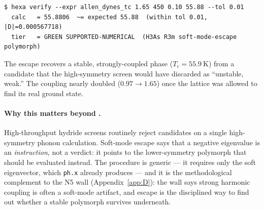 \begin{lstlisting}[basicstyle=\ttfamily\footnotesize,frame=single,xleftmargin=0pt]
$ hexa verify --expr allen_dynes_tc 1.65 450 0.10 55.88 --tol 0.01
  calc   = 55.8806  ~= expected 55.88  (within tol 0.01, |D|=0.000567718)
  tier   = GREEN SUPPORTED-NUMERICAL  (H3As R3m soft-mode-escape polymorph)
\end{lstlisting}

\noindent The escape recovers a stable, strongly-coupled phase
($T_c = \SI{55.9}{\kelvin}$) from a candidate that the high-symmetry screen
would have discarded as ``unstable, weak.'' The coupling nearly doubled
($0.97 \to 1.65$) once the lattice was allowed to find its real ground state.

\paragraph{Why this matters beyond .}
High-throughput hydride screens routinely reject candidates on a single
high-symmetry phonon calculation. Soft-mode escape says that a negative
eigenvalue is an \emph{instruction}, not a verdict: it points to the
lower-symmetry polymorph that should be evaluated instead. The procedure is
generic --- it requires only the soft eigenvector, which \texttt{ph.x}
already produces --- and it is the methodological complement to the N5 wall
(Appendix~\ref{app:D}): the wall says strong harmonic coupling is often a
soft-mode artifact, and escape is the disciplined way to find out whether a
stable polymorph survives underneath.

